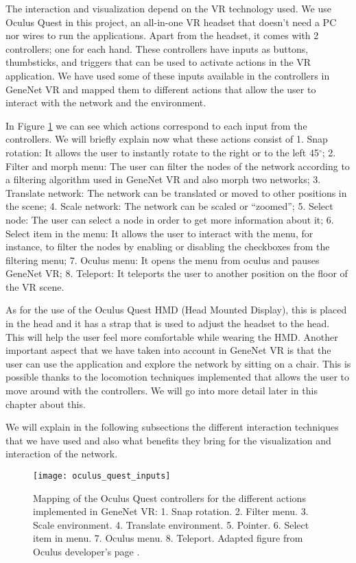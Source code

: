 The interaction and visualization depend on the VR technology used. We use Oculus Quest in this project, an all-in-one VR headset that doesn't need a PC nor wires to run the applications. Apart from the headset, it comes with 2 controllers; one for each hand. These controllers have inputs as buttons, thumbsticks, and triggers that can be used to activate actions in the VR application. We have used some of these inputs available in the controllers in GeneNet VR and mapped them to different actions that allow the user to interact with the network and the environment.

In Figure \ref{fig:oculus_quest_inputs} we can see which actions correspond to each input from the controllers. We will briefly explain now what these actions consist of 1. Snap rotation: It allows the user to instantly rotate to the right or to the left 45$^{\circ}$; 2. Filter and morph menu: The user can filter the nodes of the network according to a filtering algorithm used in GeneNet VR and also morph two networks; 3. Translate network: The network can be translated or moved to other positions in the scene; 4. Scale network: The network can be scaled or “zoomed”; 5. Select node: The user can select a node in order to get more information about it; 6. Select item in the menu: It allows the user to interact with the menu, for instance, to filter the nodes by enabling or disabling the checkboxes from the filtering menu; 7. Oculus menu: It opens the menu from oculus and pauses GeneNet VR; 8. Teleport: It teleports the user to another position on the floor of the VR scene.

As for the use of the Oculus Quest HMD (Head Mounted Display), this is placed in the head and it has a strap that is used to adjust the headset to the head. This will help the user feel more comfortable while wearing the HMD. Another important aspect that we have taken into account in GeneNet VR is that the user can use the application and explore the network by sitting on a chair. This is possible thanks to the locomotion techniques implemented that allows the user to move around with the controllers. We will go into more detail later in this chapter about this.

We will explain in the following subsections the different interaction techniques that we have used and also what benefits they bring for the visualization and interaction of the network.

\begin{figure}[h!]
    \centering%
    \texttt{[image: oculus\_quest\_inputs]}
    \caption{Mapping of the Oculus Quest controllers for the different actions implemented in GeneNet VR: 1. Snap rotation. 2. Filter menu. 3. Scale environment. 4. Translate environment. 5. Pointer. 6. Select item in menu. 7. Oculus menu. 8. Teleport. Adapted figure from Oculus developer's page \cite{oculus_inputs}.}
    \label{fig:oculus_quest_inputs}
\end{figure}%

